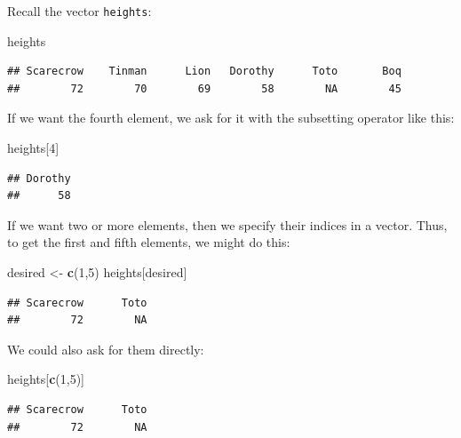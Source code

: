 \documentclass[]{book}
\makeatletter
\newenvironment{Shaded}{\begin{snugshade}}{\end{snugshade}}
\newcommand{\KeywordTok}[1]{\textcolor[rgb]{0.13,0.29,0.53}{\textbf{#1}}}
\newcommand{\DecValTok}[1]{\textcolor[rgb]{0.00,0.00,0.81}{#1}}
\newcommand{\StringTok}[1]{\textcolor[rgb]{0.31,0.60,0.02}{#1}}
\newcommand{\NormalTok}[1]{#1}
\newenvironment{kframe}{%
\medskip{}
\setlength{\fboxsep}{.8em}
 \def\at@end@of@kframe{}%
 \ifinner\ifhmode%
  \def\at@end@of@kframe{\end{minipage}}%
  \begin{minipage}{\columnwidth}%
 \fi\fi%
 \def\FrameCommand##1{\hskip\@totalleftmargin \hskip-\fboxsep
 \colorbox{shadecolor}{##1}\hskip-\fboxsep
     \hskip-\linewidth \hskip-\@totalleftmargin \hskip\columnwidth}%
 \MakeFramed {\advance\hsize-\width
   \@totalleftmargin\z@ \linewidth\hsize
   \@setminipage}}%
 {\par\unskip\endMakeFramed%
 \at@end@of@kframe}
\renewenvironment{Shaded}{\begin{kframe}}{\end{kframe}}
\theoremstyle{definition}
\theoremstyle{definition}
\theoremstyle{definition}
\theoremstyle{remark}
\makeatother
\begin{document}
Recall the vector \texttt{heights}:

\begin{Shaded}
\begin{Highlighting}[]
\NormalTok{heights}
\end{Highlighting}
\end{Shaded}

\begin{verbatim}
## Scarecrow    Tinman      Lion   Dorothy      Toto       Boq 
##        72        70        69        58        NA        45
\end{verbatim}

If we want the fourth element, we ask for it with the subsetting
operator like this:

\begin{Shaded}
\begin{Highlighting}[]
\NormalTok{heights[}\DecValTok{4}\NormalTok{]}
\end{Highlighting}
\end{Shaded}

\begin{verbatim}
## Dorothy 
##      58
\end{verbatim}

If we want two or more elements, then we specify their indices in a
vector. Thus, to get the first and fifth elements, we might do this:

\begin{Shaded}
\begin{Highlighting}[]
\NormalTok{desired <-}\StringTok{ }\KeywordTok{c}\NormalTok{(}\DecValTok{1}\NormalTok{,}\DecValTok{5}\NormalTok{)}
\NormalTok{heights[desired]}
\end{Highlighting}
\end{Shaded}

\begin{verbatim}
## Scarecrow      Toto 
##        72        NA
\end{verbatim}

We could also ask for them directly:

\begin{Shaded}
\begin{Highlighting}[]
\NormalTok{heights[}\KeywordTok{c}\NormalTok{(}\DecValTok{1}\NormalTok{,}\DecValTok{5}\NormalTok{)]}
\end{Highlighting}
\end{Shaded}

\begin{verbatim}
## Scarecrow      Toto 
##        72        NA
\end{verbatim}
\end{document}

